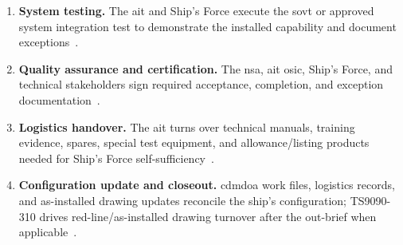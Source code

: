 \documentclass[../main.tex]{subfiles}
\begin{document}
\begin{enumerate}
        foundations, structural modifications, or software loading, under the \ac{osic}'s installation controls~\autocite{edo-4-1-4-ait-fundamentals-2025,TS9090-310}.
  \item \textbf{System testing.} The \ac{ait} and Ship's Force execute the \ac{sovt} or approved system integration test
        to demonstrate the installed capability and document exceptions~\autocite{JFMM-VolVI-RevD-Chg5-2025,TS9090-310}.
  \item \textbf{Quality assurance and certification.} The \ac{nsa}, \ac{ait} \ac{osic}, Ship's Force, and technical
        stakeholders sign required acceptance, completion, and exception documentation~\autocite{JFMM-VolVI-RevD-Chg5-2025,TS9090-310}.
  \item \textbf{Logistics handover.} The \ac{ait} turns over technical manuals, training evidence, spares, special test
        equipment, and allowance/listing products needed for Ship's Force self-sufficiency~\autocite{TS9090-310,NAVSEA-Logistics-Planning-Processes-Policy-2026}.
  \item \textbf{Configuration update and closeout.} \ac{cdmdoa} work files, logistics records, and as-installed drawing
        updates reconcile the ship's configuration; TS9090-310 drives red-line/as-installed drawing turnover after the
        out-brief when applicable~\autocite{TS9090-310,NAVSEA-Logistics-Planning-Processes-Policy-2026}.
\end{enumerate}
\end{document}

